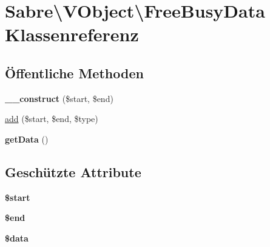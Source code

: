 \hypertarget{class_sabre_1_1_v_object_1_1_free_busy_data}{}\section{Sabre\textbackslash{}V\+Object\textbackslash{}Free\+Busy\+Data Klassenreferenz}
\label{class_sabre_1_1_v_object_1_1_free_busy_data}
\subsection*{Öffentliche Methoden}
\begin{DoxyCompactItemize}
\item 
\mbox{\label{class_sabre_1_1_v_object_1_1_free_busy_data_a4c08a9df70f1bd7c0dd79aaa6bf6e8f0}} 
{\bfseries \+\_\+\+\_\+construct} (\$start, \$end)
\item 
\mbox{\hyperlink{class_sabre_1_1_v_object_1_1_free_busy_data_ab85889b24dd65d8b81b1ec89f7838553}{add}} (\$start, \$end, \$type)
\item 
\mbox{\label{class_sabre_1_1_v_object_1_1_free_busy_data_a502c03bd7d64d493fcdcb0eb348ed506}} 
{\bfseries get\+Data} ()
\end{DoxyCompactItemize}
\subsection*{Geschützte Attribute}
\begin{DoxyCompactItemize}
\item 
\mbox{\label{class_sabre_1_1_v_object_1_1_free_busy_data_a136872e67b9458f2f2e53d92d7260470}} 
{\bfseries \$start}
\item 
\mbox{\label{class_sabre_1_1_v_object_1_1_free_busy_data_a86404a97d18dccddfd32ffda202c9201}} 
{\bfseries \$end}
\item 
\mbox{\label{class_sabre_1_1_v_object_1_1_free_busy_data_ae43ecc3419420c465bd66e278bd453c5}} 
{\bfseries \$data}
\end{DoxyCompactItemize}


